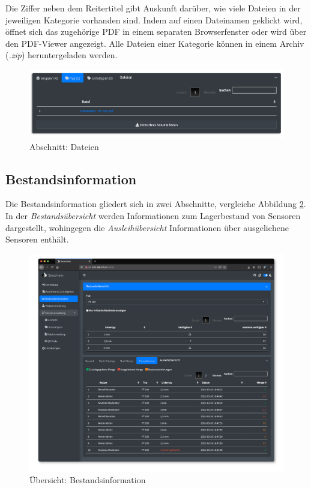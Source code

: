 \documentclass[
]{article}
\begin{document}
Die Ziffer neben dem Reitertitel gibt Auskunft darüber, wie viele Dateien in der jeweiligen Kategorie vorhanden sind. Indem auf einen Dateinamen geklickt wird, öffnet sich das zugehörige PDF in einem separaten Browserfenster oder wird über den PDF-Viewer angezeigt. Alle Dateien einer Kategorie können in einem Archiv (\emph{.zip}) heruntergeladen werden.

\begin{figure}
\centering
\includegraphics{./img/operate_detail_files.png}
\caption{\label{fig:operate-detail-files}Abschnitt: Dateien}
\end{figure}

\hypertarget{reporting}{%
\subsection{Bestandsinformation}\label{reporting}}

Die Bestandsinformation gliedert sich in zwei Abschnitte, vergleiche Abbildung \ref{fig:reporting-overview}. In der \emph{Bestandsübersicht} werden Informationen zum Lagerbestand von Sensoren dargestellt, wohingegen die \emph{Ausleihübersicht} Informationen über ausgeliehene Sensoren enthält.

\begin{figure}
\centering
\includegraphics{./img/reporting_overview.png}
\caption{\label{fig:reporting-overview}Übersicht: Bestandsinformation}
\end{figure}
\end{document}
